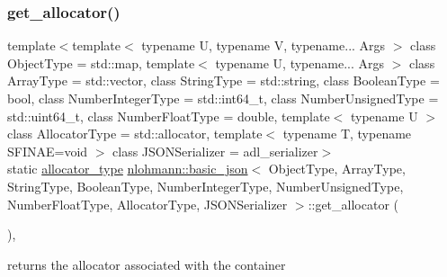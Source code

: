 \subsubsection{\texorpdfstring{get\_allocator()}{get\_allocator()}}
{\footnotesize\ttfamily template$<$template$<$ typename U, typename V, typename... Args $>$ class Object\+Type = std\+::map, template$<$ typename U, typename... Args $>$ class Array\+Type = std\+::vector, class String\+Type  = std\+::string, class Boolean\+Type  = bool, class Number\+Integer\+Type  = std\+::int64\+\_\+t, class Number\+Unsigned\+Type  = std\+::uint64\+\_\+t, class Number\+Float\+Type  = double, template$<$ typename U $>$ class Allocator\+Type = std\+::allocator, template$<$ typename T, typename S\+F\+I\+N\+A\+E=void $>$ class J\+S\+O\+N\+Serializer = adl\+\_\+serializer$>$ \\
static \mbox{\hyperlink{classnlohmann_1_1basic__json_a86ce930490cf7773b26f5ef49c04a350}{allocator\+\_\+type}} \mbox{\hyperlink{classnlohmann_1_1basic__json}{nlohmann\+::basic\+\_\+json}}$<$ Object\+Type, Array\+Type, String\+Type, Boolean\+Type, Number\+Integer\+Type, Number\+Unsigned\+Type, Number\+Float\+Type, Allocator\+Type, J\+S\+O\+N\+Serializer $>$\+::get\+\_\+allocator (\begin{DoxyParamCaption}{ }\end{DoxyParamCaption})\hspace{0.3cm}{\ttfamily [inline]}, {\ttfamily [static]}}



returns the allocator associated with the container 

\mbox{\label{classnlohmann_1_1basic__json_aefa46bd2d96bb77a38d1c8b431eab44f}} 
